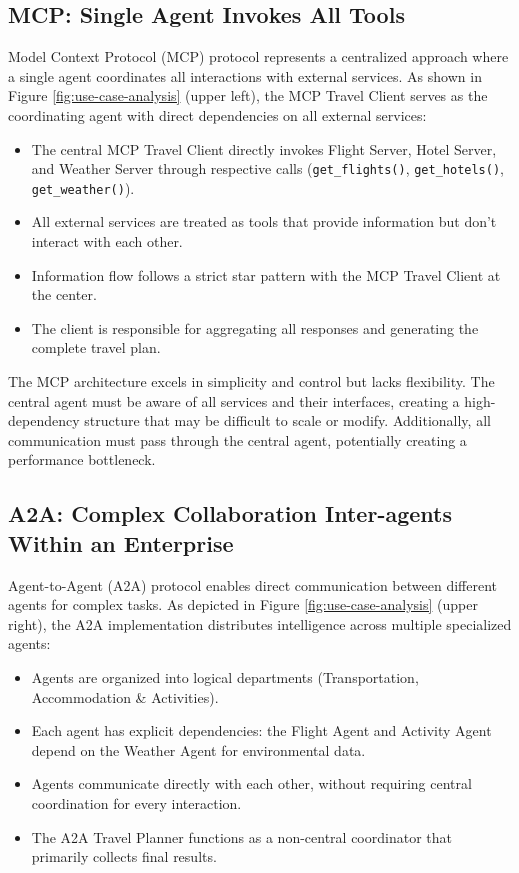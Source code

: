 \documentclass[10pt,preprint]{article}
\begin{document}
\subsection{MCP: Single Agent Invokes All Tools}

Model Context Protocol (MCP) protocol represents a centralized approach where a single agent coordinates all interactions with external services. As shown in Figure \ref{fig:use-case-analysis} (upper left), the MCP Travel Client serves as the coordinating agent with direct dependencies on all external services:
\begin{itemize}
    \item The central MCP Travel Client directly invokes Flight Server, Hotel Server, and Weather Server through respective calls (\texttt{get\_flights()}, \texttt{get\_hotels()}, \texttt{get\_weather()}).
    \item All external services are treated as tools that provide information but don't interact with each other.
    \item Information flow follows a strict star pattern with the MCP Travel Client at the center.
    \item The client is responsible for aggregating all responses and generating the complete travel plan.
\end{itemize}

The MCP architecture excels in simplicity and control but lacks flexibility. The central agent must be aware of all services and their interfaces, creating a high-dependency structure that may be difficult to scale or modify. Additionally, all communication must pass through the central agent, potentially creating a performance bottleneck.

\subsection{A2A: Complex Collaboration Inter-agents Within an Enterprise}

Agent-to-Agent (A2A) protocol enables direct communication between different agents for complex tasks. As depicted in Figure \ref{fig:use-case-analysis} (upper right), the A2A implementation distributes intelligence across multiple specialized agents:
\begin{itemize}
    \item Agents are organized into logical departments (Transportation, Accommodation \& Activities).
    \item Each agent has explicit dependencies: the Flight Agent and Activity Agent depend on the Weather Agent for environmental data.
    \item Agents communicate directly with each other, without requiring central coordination for every interaction.
    \item The A2A Travel Planner functions as a non-central coordinator that primarily collects final results.
\end{itemize}
\end{document}
